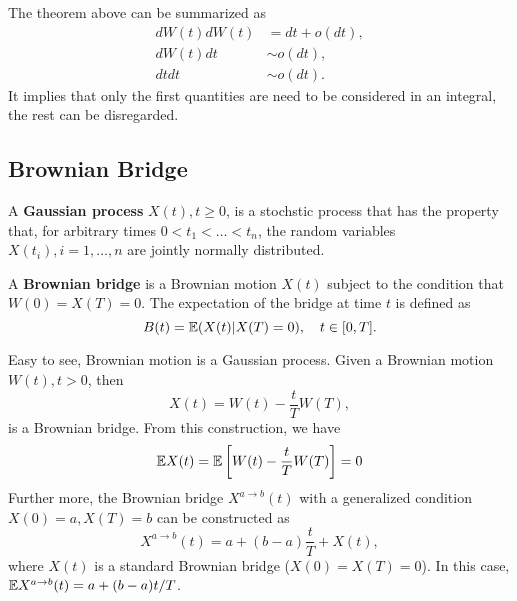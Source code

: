 The theorem above can be summarized as
\begin{equation}
\begin{aligned}
dW(t)dW(t)&=dt+o(dt),\\
dW(t)dt&\sim o(dt),\\
dtdt&\sim o(dt).
\end{aligned}
\end{equation}
It implies that only the first quantities are need to be considered in an integral, the rest can be disregarded.


\subsection{Brownian Bridge}

\begin{definition}
A \textbf{Gaussian process} $X(t),t\ge0$, is a stochstic process that has the property that, for arbitrary times $0<t_1<\dots<t_n$, the random variables $X(t_i),i=1,\dots,n$ are jointly normally distributed. 
\end{definition}


\begin{definition}
A \textbf{Brownian bridge} is a Brownian motion $X(t)$ subject to the condition that $W(0)=X(T)=0$. The expectation of the bridge at time $t$ is defined as
\begin{equation}
B(t)=\mathbb{E}(X(t)|X(T)=0),\quad t\in [0,T].
\end{equation}
\end{definition}

Easy to see, Brownian motion is a Gaussian process. Given a Brownian motion $W(t),t>0$, then
\begin{equation}
X(t)=W(t)-\frac{t}{T}W(T),
\end{equation}
is a Brownian bridge. From this construction, we have
\begin{equation}
\mathbb{E} X(t)=\mathbb{E}\left[W(t)-\frac{t}{T}W(T)\right] = 0
\end{equation}
Further more, the Brownian bridge $X^{a\to b}(t)$ with a generalized condition $X(0)=a,X(T)=b$ can be constructed as 
\begin{equation}
X^{a\to b}(t)=a+(b-a)\frac{t}{T}+X(t),
\end{equation}
where $X(t)$ is a standard Brownian bridge ($X(0)=X(T)=0$). In this case, $\mathbb{E} X^{a\to b}(t)=a+(b-a)t/T$.
